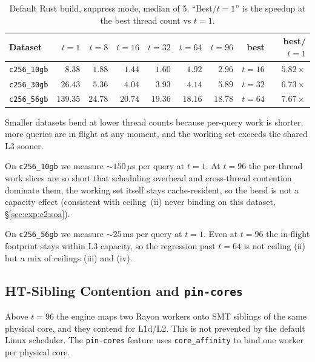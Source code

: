 \begin{table}[H]
  \centering
  \caption[Thread scaling of the default build.]{Default Rust build, suppress mode, median of 5. ``Best/$t{=}1$'' is the speedup at the best thread count vs $t{=}1$.}
  \label{tab:thread_scaling}
  \begin{tabular}{lrrrrrrrr}
    \toprule
    Dataset & $t{=}1$ & $t{=}8$ & $t{=}16$ & $t{=}32$ & $t{=}64$ & $t{=}96$ & best & best/$t{=}1$ \\
    \midrule
    \texttt{c256\_10gb} & $8.38$ & $1.88$ & $\mathbf{1.44}$ & $1.60$ & $1.92$ & $2.96$ & $t{=}16$ & $5.82\times$ \\
    \texttt{c256\_30gb} & $26.43$ & $5.36$ & $4.04$ & $\mathbf{3.93}$ & $4.14$ & $5.89$ & $t{=}32$ & $6.73\times$ \\
    \texttt{c256\_56gb} & $139.35$ & $24.78$ & $20.74$ & $19.36$ & $\mathbf{18.16}$ & $18.78$ & $t{=}64$ & $7.67\times$ \\
    \bottomrule
  \end{tabular}
\end{table}

Smaller datasets bend at lower thread counts because per-query work is shorter, more queries are in flight at any moment, and the working set exceeds the shared L3 sooner. 

On \texttt{c256\_10gb} we measure ${\sim}150\,\mu$s per query at $t=1$. At $t=96$ the per-thread work slices are so short that scheduling overhead and cross-thread contention dominate them, the working set itself stays cache-resident, so the bend is not a capacity effect (consistent with ceiling~(ii) never binding on this dataset, §\ref{sec:exp:c2:soa}).

On \texttt{c256\_56gb} we measure ${\sim}25$\,ms per query at $t=1$. Even at $t=96$ the in-flight footprint stays within L3 capacity, so the regression past $t=64$ is not ceiling (ii) but a mix of ceilings (iii) and (iv).

\subsection{HT-Sibling Contention and \texttt{pin-cores}\label{sec:exp:scaling:pin}}

Above $t=96$ the engine maps two Rayon workers onto SMT siblings of the same physical core, and they contend for L1d/L2. This is not prevented by the default Linux scheduler. The \texttt{pin-cores} feature uses \texttt{core\_affinity} to bind one worker per physical core.

